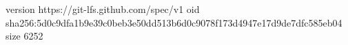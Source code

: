 version https://git-lfs.github.com/spec/v1
oid sha256:5d0c9dfa1b9e39c0beb3e50dd513b6d0c9078f173d4947e17d9de7dfc585eb04
size 6252
